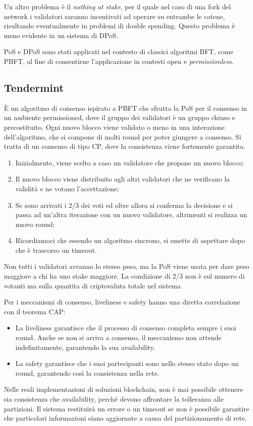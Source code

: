 Un altro problema è il \textit{nothing at stake}, per il quale nel caso di una fork del network i validatori saranno incentivati ad operare su entrambe le catene, risultando eventualmente in problemi di double spending. Questo problema è meno evidente in un sistema di DPoS.

PoS e DPoS sono stati applicati nel contesto di classici algoritmi BFT, come PBFT, al fine di consentirne l'applicazione in contesti open e \textit{permissionless}.

\subsection{Tendermint}
È un algoritmo di consenso ispirato a PBFT che sfrutta la PoS per il consenso in un ambiente permissioned, dove il gruppo dei validatori è un gruppo chiuso e precostituito. Ogni nuovo blocco viene validato o meno in una interazione dell'algoritmo, che si compone di molti round per poter giungere a consenso. Si tratta di un consenso di tipo CP, dove la consistenza viene fortemente garantita.

\begin{enumerate}
    \item Inizialmente, viene scelto a caso un validatore che propone un nuovo blocco;
    \item Il nuovo blocco viene distribuito agli altri validatori che ne verificano la validità e ne votano l'accettazione;
    \item Se sono arrivati i 2/3 dei voti ed oltre allora si conferma la decisione e si passa ad un'altra iterazione con un nuovo validatore, altrimenti si realizza un nuovo round;
    \item Ricordiamoci che essendo un algoritmo sincrono, si smette di aspettare dopo che è trascorso un timeout.
\end{enumerate}
Non tutti i validatori avranno lo stesso peso, ma la PoS viene usata per dare peso maggiore a chi ha uno stake maggiore. La condizione di 2/3 non è sul numero di votanti ma sulla quantita di criptovaluta totale nel sistema.

\vspace{5mm}

Per i meccanismi di consenso, liveliness e safety hanno una diretta correlazione con il teorema CAP:
\begin{itemize}
    \item La liveliness garantisce che il processo di consenso completa sempre i suoi round. Anche se non si arriva a consenso, il meccanismo non attende indefinitamente, garantendo la sua availability.
    \item La safety garantisce che i suoi partecipanti sono nello stesso stato dopo un round, garantendo così la consistenza nella rete.
\end{itemize}
Nelle reali implementazioni di soluzioni blockchain, non è mai possibile ottenere sia consistenza che availability, perché devono affrontare la tolleranza alle partizioni. Il sistema restituirà un errore o un timeout se non è possibile garantire che particolari informazioni siano aggiornate a causa del partizionamento di rete.

